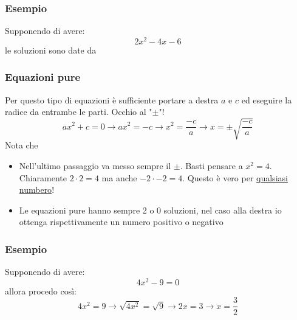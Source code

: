 \subsubsection{Esempio}
Supponendo di avere:
\[
	2x^2  - 4x - 6
\]
le soluzioni sono date da
\begin{center}
\end{center}

\subsubsection{Equazioni pure}
Per questo tipo di equazioni è sufficiente portare a destra $ a $ e $ c $ ed eseguire la radice da entrambe le parti. Occhio al "$ \pm $"!
\[
	ax^2 + c  = 0 \rightarrow ax^2  = -c \rightarrow x^2  = \frac{-c}{a} \rightarrow x = \pm \sqrt{\frac{-c}{a}}
\]
Nota che
\begin{itemize}
	\item Nell'ultimo passaggio va messo sempre il $ \pm $. Basti pensare a $ x^2  = 4 $. Chiaramente $ 2 \cdot 2 = 4 $ ma anche $ -2 \cdot  -2  = 4$. Questo è vero per \underline{qualsiasi numbero}!
	\item Le equazioni pure hanno sempre 2 o 0 soluzioni, nel caso alla destra io ottenga rispettivamente un numero positivo o negativo
\end{itemize}
\subsubsection{Esempio}
Supponendo di avere:
\[
	4x^2 -9 = 0
\]
allora procedo così:
\[
	4x^2 = 9 \rightarrow \sqrt{4x^2 } = \sqrt{9} \rightarrow 2x = 3 \rightarrow x = \frac{3}{2}
\]

